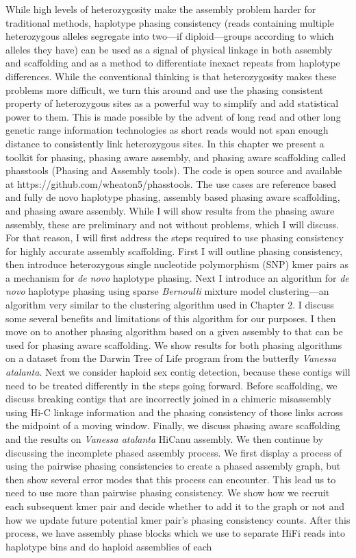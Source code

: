 \par{
While high levels of heterozygosity make the assembly problem harder for traditional methods, haplotype phasing consistency (reads containing multiple heterozygous alleles segregate into two---if diploid---groups according to which alleles they have) can be used as a signal of physical linkage in both assembly and scaffolding and as a method to differentiate inexact repeats from haplotype differences. While the conventional thinking is that heterozygosity makes these problems more difficult, we turn this around and use the phasing consistent property of heterozygous sites as a powerful way to simplify and add statistical power to them. This is made possible by the advent of long read and other long genetic range information technologies as short reads would not span enough distance to consistently link heterozygous sites. In this chapter we present a toolkit for phasing, phasing aware assembly, and phasing aware scaffolding called phasstools (Phasing and Assembly tools). The code is open source and available at https://github.com/wheaton5/phasstools. The use cases are reference based and fully de novo haplotype phasing, assembly based phasing aware scaffolding, and phasing aware assembly. While I will show results from the phasing aware assembly, these are preliminary and not without problems, which I will discuss. For that reason, I will first address the steps required to use phasing consistency for highly accurate assembly scaffolding. First I will outline phasing consistency, then introduce heterozygous single nucleotide polymorphism (SNP) kmer pairs as a mechanism for \textit{de novo} haplotype phasing. Next I introduce an algorithm for \textit{de novo} haplotype phasing using sparse \textit{Bernoulli} mixture model clustering---an algorithm very similar to the clustering algorithm used in Chapter 2. I discuss some several benefits and limitations of this algorithm for our purposes. I then move on to another phasing algorithm based on a given assembly to that can be used for phasing aware scaffolding. We show results for both phasing algorithms on a dataset from the Darwin Tree of Life program from the butterfly \textit{Vanessa atalanta}. Next we consider haploid sex contig detection, because these contigs will need to be treated differently in the steps going forward. Before scaffolding, we discuss breaking contigs that are incorrectly joined in a chimeric misassembly using Hi-C linkage information and the phasing consistency of those links across the midpoint of a moving window. Finally, we discuss phasing aware scaffolding and the results on \textit{Vanessa atalanta} HiCanu assembly. We then continue by discussing the incomplete phased assembly process. We first display a process of using the pairwise phasing consistencies to create a phased assembly graph, but then show several error modes that this process can encounter. This lead us to need to use more than pairwise phasing consistency. We show how we recruit each subsequent kmer pair and decide whether to add it to the graph or not and how we update future potential kmer pair's phasing consistency counts. After this process, we have assembly phase blocks which we use to separate HiFi reads into haplotype bins and do haploid assemblies of each }
